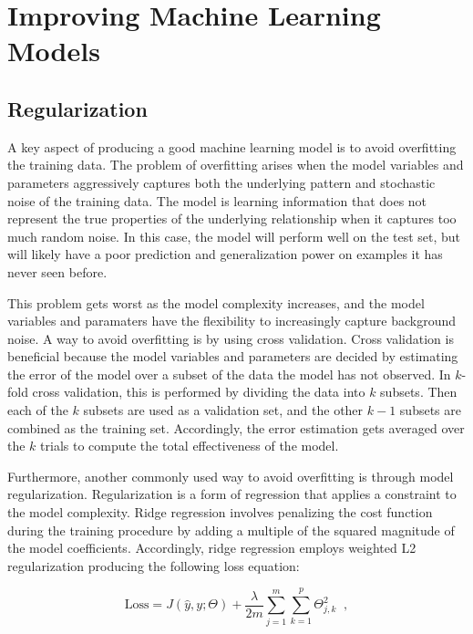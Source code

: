 
\section{Improving Machine Learning Models}

\subsection{Regularization}

A key aspect of producing a good machine learning model is to avoid overfitting the training data. The problem of overfitting arises when the model variables and parameters aggressively captures both the underlying pattern and stochastic noise of the training data. The model is learning information that does not represent the true properties of the underlying relationship when it captures too much random noise. In this case, the model will perform well on the test set, but will likely have a poor prediction and generalization power on examples it has never seen before. 

This problem gets worst as the model complexity increases, and the model variables and paramaters have the flexibility to increasingly capture background noise. A way to avoid overfitting is by using cross validation. Cross validation is beneficial because the model variables and parameters are decided by estimating the error of the model over a subset of the data the model has not observed. In $k$-fold cross validation, this is performed by dividing the data into $k$ subsets. Then each of the $k$ subsets are used as a validation set, and the other $k-1$ subsets are combined as the training set. Accordingly, the error estimation gets averaged over the $k$ trials to compute the total effectiveness of the model.

Furthermore, another commonly used way to avoid overfitting is through model regularization. Regularization is a form of regression that applies a constraint to the model complexity. Ridge regression involves penalizing the cost function during the training procedure by adding a multiple of the squared magnitude of the model coefficients. Accordingly, ridge regression employs weighted L2 regularization producing the following loss equation:

\begin{equation} \label{eq:l2reg}
    \mathrm{Loss} = J(\hat{y},y;\Theta) + \frac{\lambda}{2m} \sum_{j=1}^{m} \sum_{k=1}^{p} \Theta_{j,k}^{2} \;\;,
\end{equation}

